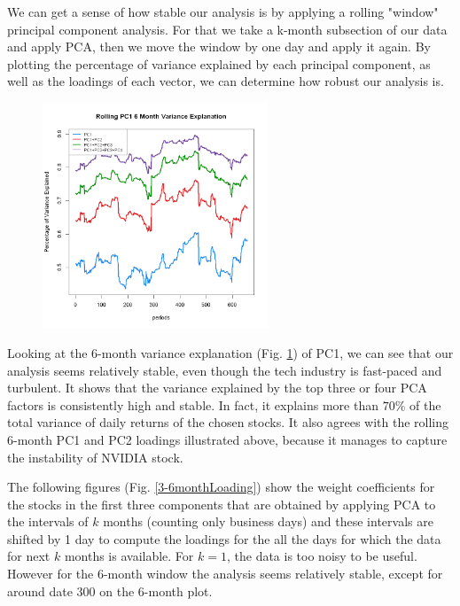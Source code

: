 \documentclass{article}
\begin{document}
We can get a sense of how stable our analysis is by applying a rolling "window" principal component analysis. For that we take a k-month subsection of our data and apply PCA, then we move the window by one day and apply it again. By plotting the percentage of variance explained by each principal component, as well as the loadings of each vector, we can determine how robust our analysis is. 
\begin{figure}[H]
\caption{}
\centering
\includegraphics[width=0.6\textwidth]{PC1_6M.png}
\label{tech_6M_varexp}

\end{figure}

Looking at the 6-month variance explanation (Fig. \ref{tech_6M_varexp}) of PC1, we can see that our analysis seems relatively stable, even though the tech industry is fast-paced and turbulent. It shows that the variance explained by the top three or four PCA factors is consistently high and stable. In fact, it explains more than $70\%$ of the total variance of daily returns of the chosen stocks. It also agrees with the rolling 6-month PC1 and PC2 loadings illustrated above, because it manages to capture the instability of NVIDIA stock.


The following figures (Fig. \ref{3-6monthLoading}) show the weight coefficients for the stocks in the first three components that are obtained by applying PCA to the intervals of $k$ months (counting only business days) and these intervals are shifted by 1 day to compute the loadings for the all the days for which the data for next $k$ months is available. For $k=1$, the data is too noisy to be useful. However for the 6-month window the analysis seems relatively stable, except for around date 300 on the 6-month plot.
\\
 \newline
\end{document}
